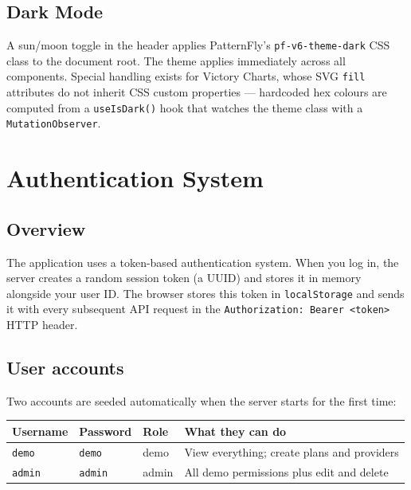 \documentclass[12pt,a4paper]{article}
\begin{document}
\subsection{Dark Mode}

A sun/moon toggle in the header applies PatternFly's \texttt{pf-v6-theme-dark} CSS class to the document root. The theme applies immediately across all components. Special handling exists for Victory Charts, whose SVG \texttt{fill} attributes do not inherit CSS custom properties — hardcoded hex colours are computed from a \texttt{useIsDark()} hook that watches the theme class with a \texttt{MutationObserver}.

\section{Authentication System}

\subsection{Overview}

The application uses a token-based authentication system. When you log in, the server creates a random session token (a UUID) and stores it in memory alongside your user ID. The browser stores this token in \texttt{localStorage} and sends it with every subsequent API request in the \texttt{Authorization: Bearer <token>} HTTP header.

\subsection{User accounts}

Two accounts are seeded automatically when the server starts for the first time:

\begin{center}
\begin{tabular}{llll}
  \toprule
  \textbf{Username} & \textbf{Password} & \textbf{Role} & \textbf{What they can do} \\
  \midrule
  \texttt{demo}  & \texttt{demo}  & demo  & View everything; create plans and providers \\
  \texttt{admin} & \texttt{admin} & admin & All demo permissions plus edit and delete \\
  \bottomrule
\end{tabular}
\end{center}
\end{document}
